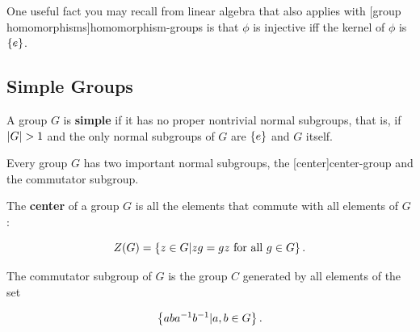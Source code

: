 \documentclass{article}
\begin{document}
\begin{theorem}\label{homomorphism-injective-iff-trivial-kernel}
One useful fact you may recall from linear algebra that also applies with \@[group homomorphisms]{homomorphism-groups} is that $\phi$ is injective iff the \@{kernel} of $\phi$ is $\left\{ e \right\}$.
\end{theorem}

\subsection{Simple Groups}

\begin{definition}[simple]
A \@{group} $G$ is \textbf{simple} if it has no proper nontrivial \@{normal} \@{subgroups}, that is, if $\left| G \right| > 1$ and the only normal subgroups of $G$ are $\left\{ e \right\}$ and $G$ itself.
\end{definition}

Every \@{group} $G$ has two important \@{normal} \@{subgroups}, the \@[center]{center-group} and the \@{commutator} subgroup.

\begin{definition}
The \textbf{center} of a \@{group} $G$ is all the elements that commute with all elements of $G$:

\[ Z(G) = \left\{ z \in G | zg = gz \text{ for all } g \in G \right\}. \]
\end{definition}

\begin{definition}[commutator]
The commutator \@{subgroup} of $G$ is the \@{group} $C$ generated by all elements of the set

\[ \left\{ aba^{-1}b^{-1} | a,b \in G \right\}. \]
\end{definition}
\end{document}
